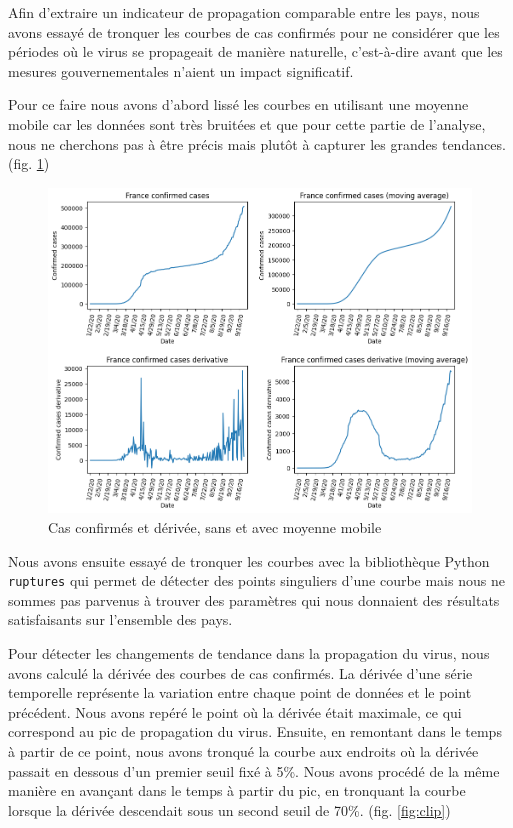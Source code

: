 \documentclass[12pt]{iEEEtran}
\begin{document}
Afin d'extraire un indicateur de propagation comparable entre les pays, nous avons essayé de tronquer
les courbes de cas confirmés pour ne considérer que les périodes où le virus se propageait de manière
naturelle, c'est-à-dire avant que les mesures gouvernementales n'aient un impact significatif.

Pour ce faire nous avons d'abord lissé les courbes en utilisant une moyenne mobile car les données sont
très bruitées et que pour cette partie de l'analyse, nous ne cherchons pas à être précis mais plutôt à
capturer les grandes tendances. (fig. \ref{fig:moving_avg})

\begin{figure}[h]
    \centering
    \includegraphics[width=\columnwidth]{img/moving_avg.png}
    \caption{Cas confirmés et dérivée, sans et avec moyenne mobile}
    \label{fig:moving_avg}
\end{figure}

Nous avons ensuite essayé de tronquer les courbes avec la bibliothèque Python \texttt{ruptures} qui
permet de détecter des points singuliers d'une courbe mais nous ne sommes pas parvenus à trouver
des paramètres qui nous donnaient des résultats satisfaisants sur l'ensemble des pays.

Pour détecter les changements de tendance dans la propagation du virus, nous avons calculé la dérivée
des courbes de cas confirmés. La dérivée d'une série temporelle représente la variation entre chaque point
de données et le point précédent. Nous avons repéré le point où la dérivée était maximale, ce qui
correspond au pic de propagation du virus. Ensuite, en remontant dans le temps à partir de ce point,
nous avons tronqué la courbe aux endroits où la dérivée passait en dessous d'un premier seuil fixé à 5\%.
Nous avons procédé de la même manière en avançant dans le temps à partir du pic, en tronquant la courbe
lorsque la dérivée descendait sous un second seuil de 70\%. (fig. \ref{fig:clip})
\end{document}

